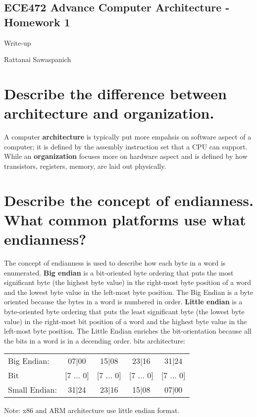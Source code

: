 \documentclass[letterpaper,10pt,titlepage,fleqn]{article}
\begin{document}
\pagestyle{empty}

\begin{center}
\section*{ECE472 Advance Computer Architecture - Homework 1}
Write-up

Rattanai Sawaspanich
\end{center}


\section*{Describe the difference between architecture and organization.}

A computer \textbf{architecture} is typically put more empahsis on software aspect of a computer; it is defined by the assembly instruction set that a CPU can support. 
While an \textbf{organization} focuses more on hardware aspect and is defined by how transistors, registers, memory, are laid out physically.

\section*{Describe the concept of endianness. What common platforms use what endianness?}

The concept of endianness is used to describe how each byte in a word is enumerated. 
\textbf{Big endian} is a bit-oriented byte ordering that puts the most significant byte (the highest byte value) in the right-most byte position of a word and the lowest byte value in the left-most byte position. The Big Endian is a byte oriented because the bytes in a word is numbered in order. 
\textbf{Little endian} is a byte-oriented byte ordering that puts the least significant byte (the lowest byte value) in the right-most bit position of a word and the highest byte value in the left-most byte position. The Little Endian enriches the bit-orientation because all the bits in a word is in a decending order.
 bits architecture: \newline
\begin{tabular} {l c  c  c  c}
   Big   Endian:   & 07|00    &  15|08    & 23|16    & 31|24\\ 
   Bit             & [7 ... 0]&  [7 ... 0]& [7 ... 0]& [7 ... 0]\\ 
   Small Endian:   & 31|24    &  23|16    & 15|08    &  07|00 \\
\end{tabular}
\newline
Note: x86 and ARM architecture use little endian format.
\end{document}
